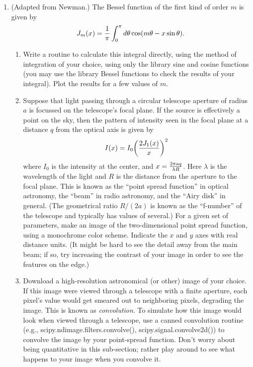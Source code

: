 \documentclass[]{article}
\begin{document}
\begin{enumerate}
\item  (Adapted from Newman.) The Bessel function of the first kind of order $m$ is given by 
\begin{equation}
  J_m(x) = {1 \over \pi} \int_0^\pi d\theta \cos (m \theta - x \sin\theta).
\end{equation}
\begin{enumerate}[a] 
\item Write a routine to calculate this integral directly, using the method of integration of your choice, using only the library sine and cosine functions (you may use the library Bessel functions to check the results of your integral).  Plot the results for a few values of $m$.
\item
Suppose that light passing through a circular telescope aperture of radius $a$ is focussed on the telescope's focal plane.  If the source is effectively a point on the sky, then the pattern of intensity seen in the focal plane at a distance $q$ from the optical axis is given by 
\begin{equation}
I(x) = I_0{\left( 2  J_1(x) \over x\right)^2}
\end{equation}
where $I_0 $ is the intensity at the center, and $x = {2 \pi a q \over \lambda  R}$.  Here $\lambda$ is the wavelength of the light and $R$ is the distance from the aperture to the focal plane.  This is known as the ``point spread function'' in optical astronomy, the ``beam'' in radio astronomy, and the ``Airy disk'' in general.  (The geometrical ratio $R/(2a)$ is known as the ``f-number'' of the telescope and typically has values of several.)  For a given set of parameters, make an image of the two-dimensional point spread function, using a monochrome color scheme.  Indicate the $x$ and $y$ axes with real distance units.  (It might be hard to see the detail away from the main beam; if so, try increasing the contrast of your image in order to see the features on the edge.)  
\item Download a high-resolution astronomical (or other) image of your choice.  If this image were viewed through a telescope with a finite aperture, each pixel's value would get smeared out to neighboring pixels, degrading the image.  This is known as {\it convolution}.  To simulate how this image would look when viewed through a telescope, use a canned convolution routine (e.g., scipy.ndimage.filters.convolve(), scipy.signal.convolve2d())  to convolve the image by your point-spread function.  Don't worry about being quantitative in this sub-section; rather play around to see what happens to your image when you convolve it.
\end{enumerate}


\end{enumerate}
\end{document}
